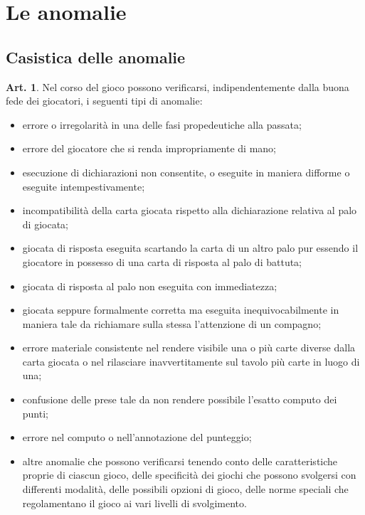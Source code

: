 \documentclass[italian,a4paper]{article}
\theoremstyle{definition}
\newtheorem{art}{Art.}
\newenvironment{packeditem}{
\begin{itemize}
  \setlength{\itemsep}{1pt}
  \setlength{\parskip}{0pt}
  \setlength{\parsep}{0pt}
}{\end{itemize}}
\begin{document}
\section{Le anomalie}
\subsection{Casistica delle anomalie}
\begin{art}
    Nel corso del gioco possono verificarsi, indipendentemente dalla buona fede dei giocatori, i seguenti tipi di anomalie:
    \begin{packeditem}
\item errore o irregolarità in una delle fasi propedeutiche alla passata;
\item errore del giocatore che si renda impropriamente di mano;
\item esecuzione di dichiarazioni non consentite, o eseguite in maniera difforme o eseguite intempestivamente;
\item incompatibilità della carta giocata rispetto alla dichiarazione relativa al palo di giocata;
\item giocata di risposta eseguita scartando la carta di un altro palo pur essendo il giocatore in possesso di una carta di risposta al palo di battuta;
\item  giocata di risposta al palo non eseguita con immediatezza;
\item giocata seppure formalmente corretta ma eseguita inequivocabilmente in maniera tale da richiamare sulla stessa l'attenzione di un compagno;
\item errore materiale consistente nel rendere visibile una o più carte diverse dalla carta giocata o nel rilasciare inavvertitamente sul tavolo più carte in luogo di una;
\item   confusione delle prese tale da non rendere possibile l'esatto computo dei punti;
\item   errore nel computo o nell'annotazione del punteggio;
\item altre anomalie che possono verificarsi tenendo conto delle caratteristiche proprie di ciascun gioco, delle specificità dei giochi che possono svolgersi con differenti modalità, delle possibili opzioni di gioco, delle norme speciali che regolamentano il gioco ai vari livelli di svolgimento.
    \end{packeditem}
\end{art}
\end{document}
